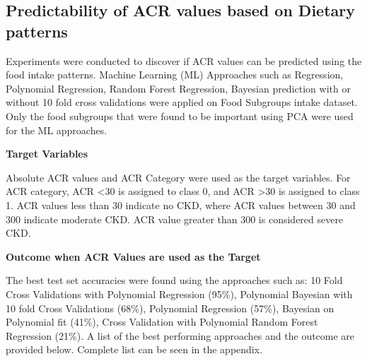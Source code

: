 \subsection{\textbf{Predictability of ACR values based on Dietary patterns}}
Experiments were conducted to discover if ACR values can be predicted using the food intake patterns. Machine Learning (ML) Approaches such as Regression, Polynomial Regression, Random Forest Regression, Bayesian prediction with or without 10 fold cross validations were applied on Food Subgroups intake dataset. Only the food subgroups that were found to be important using PCA were used for the ML approaches.

\medskip 
\noindent \textbf{Target Variables}


\noindent Absolute ACR values and ACR Category were used as the target variables.  For ACR category, ACR \textless 30 is assigned to class 0, and ACR \textgreater 30 is assigned to class 1. ACR values less than 30 indicate no CKD, where ACR values between 30 and 300 indicate moderate CKD. ACR value greater than 300 is considered severe CKD.

\medskip 
\noindent \textbf{Outcome when ACR Values are used as the Target }


\noindent The best test set accuracies were found using the approaches such as: 10 Fold Cross Validations with Polynomial Regression (95\%), Polynomial Bayesian with 10 fold Cross Validations (68\%), Polynomial Regression (57\%), Bayesian on Polynomial fit (41\%), Cross Validation with Polynomial Random Forest Regression (21\%). A list of the best performing approaches and the outcome are provided below. Complete list can be seen in the appendix. 

\medskip


